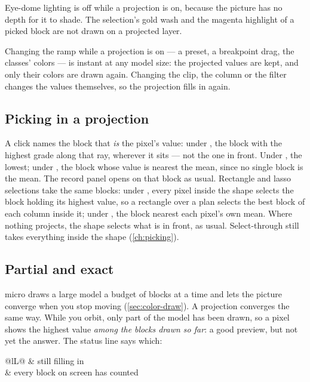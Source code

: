 Eye-dome lighting is off while a projection is on, because the picture has no depth for it to shade. The selection's gold wash and the magenta highlight of a picked block are not drawn on a projected layer.

Changing the ramp while a projection is on — a preset, a breakpoint drag, the classes' colors — is instant at any model size: the projected values are kept, and only their colors are drawn again. Changing the clip, the column or the filter changes the values themselves, so the projection fills in again.

\subsection{Picking in a projection}
A click names the block that \emph{is} the pixel's value: under , the block with the highest grade along that ray, wherever it sits — not the one in front. Under , the lowest; under , the block whose value is nearest the mean, since no single block is the mean. The record panel opens on that block as usual. Rectangle and lasso selections take the same blocks: under , every pixel inside the shape selects the block holding its highest value, so a rectangle over a plan selects the best block of each column inside it; under , the block nearest each pixel's own mean. Where nothing projects, the shape selects what is in front, as usual. Select-through still takes everything inside the shape (\cref{ch:picking}).

\subsection{Partial and exact}
micro draws a large model a budget of blocks at a time and lets the picture converge when you stop moving (\cref{sec:color-draw}). A projection converges the same way. While you orbit, only part of the model has been drawn, so a pixel shows the highest value \emph{among the blocks drawn so far}: a good preview, but not yet the answer. The status line says which:

\begin{center}
\begin{tabularx}{\linewidth}{@{}lL@{}}\toprule
{} & still filling in \\
 & every block on screen has counted \\ \bottomrule
\end{tabularx}
\end{center}

